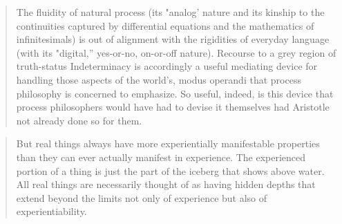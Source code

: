 \documentclass[a4paper]{Thesis}
\begin{document}
	
	
	\begin{quotation}
		The fluidity of natural process (its "analog' nature and its kinship to
		the continuities captured by differential equations and the mathematics of infinitesimals)
		is out of alignment with the rigidities of everyday language (with its "digital,'' yes-or-no,
		on-or-off nature). Recourse to a grey region of truth-status Indeterminacy is accordingly a
		useful mediating device for handling those aspects of the world's, modus operandi that
		process philosophy is concerned to emphasize. So useful, indeed, is this device that
		process philosophers would have had to devise it themselves had Aristotle not already
		done so for them.
	\end{quotation}
	
	\begin{quotation}
		But real
		things always have more experientially manifestable properties than they can ever
		actually manifest in experience. The experienced portion of a thing is just the part of the
		iceberg that shows above water. All real things are necessarily thought of as having
		hidden depths that extend beyond the limits not only of experience but also of
		experientiability.
	\end{quotation}
	
\end{document}
